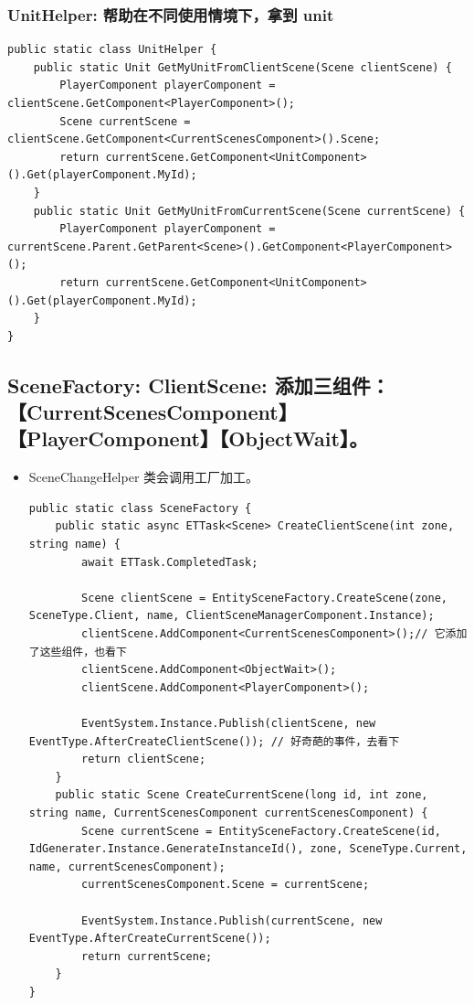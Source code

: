 \documentclass[9pt, b5paper]{article}
\begin{document}
\subsubsection{UnitHelper: 帮助在不同使用情境下，拿到 unit}
\label{sec-3-1-4}
\begin{verbatim}
public static class UnitHelper {
    public static Unit GetMyUnitFromClientScene(Scene clientScene) {
        PlayerComponent playerComponent = clientScene.GetComponent<PlayerComponent>();
        Scene currentScene = clientScene.GetComponent<CurrentScenesComponent>().Scene;
        return currentScene.GetComponent<UnitComponent>().Get(playerComponent.MyId);
    }
    public static Unit GetMyUnitFromCurrentScene(Scene currentScene) {
        PlayerComponent playerComponent = currentScene.Parent.GetParent<Scene>().GetComponent<PlayerComponent>();
        return currentScene.GetComponent<UnitComponent>().Get(playerComponent.MyId);
    }
}
\end{verbatim}

\subsection{SceneFactory: ClientScene: 添加三组件：【CurrentScenesComponent】【PlayerComponent】【ObjectWait】。}
\label{sec-3-2}
\begin{itemize}
\item SceneChangeHelper 类会调用工厂加工。
\begin{verbatim}
public static class SceneFactory {
    public static async ETTask<Scene> CreateClientScene(int zone, string name) {
        await ETTask.CompletedTask;

        Scene clientScene = EntitySceneFactory.CreateScene(zone, SceneType.Client, name, ClientSceneManagerComponent.Instance);
        clientScene.AddComponent<CurrentScenesComponent>();// 它添加了这些组件，也看下
        clientScene.AddComponent<ObjectWait>();
        clientScene.AddComponent<PlayerComponent>();

        EventSystem.Instance.Publish(clientScene, new EventType.AfterCreateClientScene()); // 好奇葩的事件，去看下
        return clientScene;
    }
    public static Scene CreateCurrentScene(long id, int zone, string name, CurrentScenesComponent currentScenesComponent) {
        Scene currentScene = EntitySceneFactory.CreateScene(id, IdGenerater.Instance.GenerateInstanceId(), zone, SceneType.Current, name, currentScenesComponent);
        currentScenesComponent.Scene = currentScene;

        EventSystem.Instance.Publish(currentScene, new EventType.AfterCreateCurrentScene());
        return currentScene;
    }
}
\end{verbatim}
\end{itemize}
\end{document}
